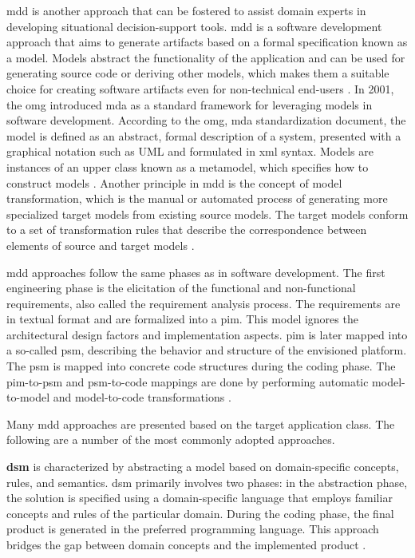 \gls{mdd} is another approach that can be fostered to assist domain experts in developing situational decision-support tools. \gls{mdd} is a software development approach that aims to generate artifacts based on a formal specification known as a model. Models abstract the functionality of the application and can be used for generating source code or deriving other models, which makes them a suitable choice for creating software artifacts even for non-technical end-users \autocite{Dorodnykh2021}. In 2001, the \gls{omg} introduced \gls{mda} as a standard framework for leveraging models in software development. According to the \gls{omg}, \gls{mda} standardization document, the model is defined as an abstract, formal description of a system, presented with a graphical notation such as UML and formulated in \gls{xml} syntax. Models are instances of an upper class known as a metamodel, which specifies how to construct models \autocite{Haav2018}. Another principle in \gls{mdd} is the concept of model transformation, which is the manual or automated process of generating more specialized target models from existing source models. The target models conform to a set of transformation rules that describe the correspondence between elements of source and target models \autocite{Dorodnykh2021}.

\gls{mdd} approaches follow the same phases as in software development. The first engineering phase is the elicitation of the functional and non-functional requirements, also called the requirement analysis process. The requirements are in textual format and are formalized into a \gls{pim}. This model ignores the architectural design factors and implementation aspects. \gls{pim} is later mapped into a so-called \gls{psm}, describing the behavior and structure of the envisioned platform. The \gls{psm} is mapped into concrete code structures during the coding phase. The \gls{pim}-to-\gls{psm} and \gls{psm}-to-code mappings are done by performing automatic model-to-model and model-to-code transformations \autocite{Tschudnowsky2016}.

Many \gls{mdd} approaches are presented based on the target application class. The following are a number of the most commonly adopted approaches.

\textbf{\gls{dsm}} is characterized by abstracting a
model based on domain-specific concepts, rules, and semantics. \gls{dsm}
primarily involves two phases: in the abstraction phase, the solution is
specified using a domain-specific language that employs familiar
concepts and rules of the particular domain. During the coding phase,
the final product is generated in the preferred programming language.
This approach bridges the gap between domain concepts and the
implemented product \autocite{Lethrech2016}.

